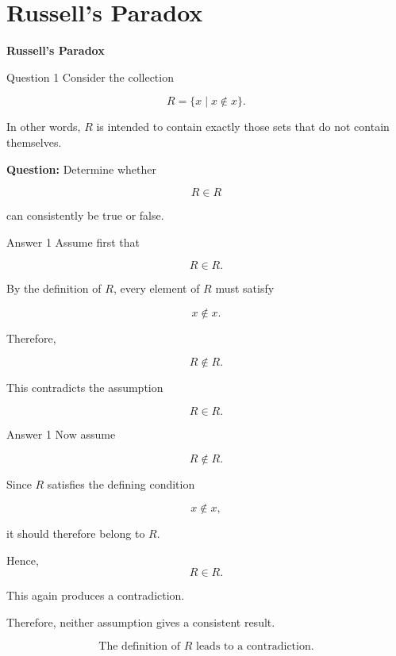 \section{Russell's Paradox}

\begin{frame}
\centering
\Huge\textbf{Russell's Paradox}
\end{frame}


\begin{frame}{Question 1}
Consider the collection

$$
R=\{x\mid x\notin x\}.
$$

In other words, $R$ is intended to contain exactly those sets that do not contain themselves.

\textbf{Question:} Determine whether

$$
R\in R
$$

can consistently be true or false.
\end{frame}

\begin{frame}{Answer 1}
Assume first that

$$
R\in R.
$$

By the definition of $R$, every element of $R$ must satisfy

$$
x\notin x.
$$

Therefore,

$$
R\notin R.
$$

This contradicts the assumption

$$
R\in R.
$$

\end{frame}

\begin{frame}{Answer 1}
Now assume

$$
R\notin R.
$$

Since $R$ satisfies the defining condition

$$
x\notin x,
$$

it should therefore belong to $R$.

Hence,
$$
R\in R.
$$

This again produces a contradiction.

Therefore, neither assumption gives a consistent result.

$$
\boxed{\text{The definition of }R\text{ leads to a contradiction.}}
$$

\end{frame}


